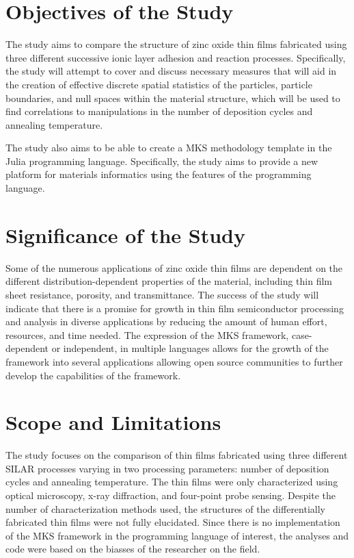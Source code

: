 \section{Objectives of the Study}
The study aims to compare the structure of zinc oxide thin films fabricated using three different successive ionic layer adhesion and reaction processes.
Specifically, the study will attempt to cover and discuss necessary measures that will aid in the creation of effective discrete spatial statistics of the particles, particle boundaries, and null spaces within the material structure, which will be used to find correlations to manipulations in the number of deposition cycles and annealing temperature.

The study also aims to be able to create a MKS methodology template in the Julia programming language.
Specifically, the study aims to provide a new platform for materials informatics using the features of the programming language.

\section{Significance of the Study}
Some of the numerous applications of zinc oxide thin films are dependent on the different distribution-dependent properties of the material, including thin film sheet resistance, porosity, and transmittance.
The success of the study will indicate that there is a promise for growth in thin film semiconductor processing and analysis in diverse applications by reducing the amount of human effort, resources, and time needed.
The expression of the MKS framework, case-dependent or independent, in multiple languages allows for the growth of the framework into several applications allowing open source communities to further develop the capabilities of the framework.

\section{Scope and Limitations}
The study focuses on the comparison of thin films fabricated using three different SILAR processes varying in two processing parameters: number of deposition cycles and annealing temperature.
The thin films were only characterized using optical microscopy, x-ray diffraction, and four-point probe sensing.
Despite the number of characterization methods used, the structures of the differentially fabricated thin films were not fully elucidated.
Since there is no implementation of the MKS framework in the programming language of interest, the analyses and code were based on the biasses of the researcher on the field.
